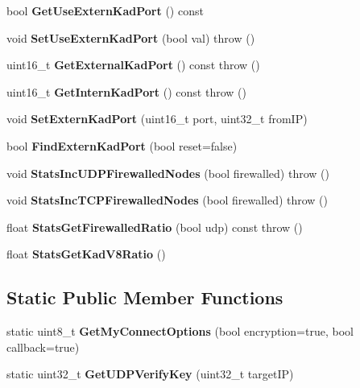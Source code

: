 \begin{DoxyCompactItemize}
\item 
bool {\bfseries GetUseExternKadPort} () const \label{classKademlia_1_1CPrefs_ae111c7c98b020a4cfd2593df2df389b2}

\item 
void {\bfseries SetUseExternKadPort} (bool val)  throw ()\label{classKademlia_1_1CPrefs_ac9e18ca59df611c6b7f33042c5206411}

\item 
uint16\_\-t {\bfseries GetExternalKadPort} () const   throw ()\label{classKademlia_1_1CPrefs_a98ee0bd69bb5c12e6f5aa9ae1091f518}

\item 
uint16\_\-t {\bfseries GetInternKadPort} () const   throw ()\label{classKademlia_1_1CPrefs_a96e68fb42c9a3696e2dae2fbdce6defe}

\item 
void {\bfseries SetExternKadPort} (uint16\_\-t port, uint32\_\-t fromIP)\label{classKademlia_1_1CPrefs_aa3e22c17c49c8e740e6c81715fdd3e69}

\item 
bool {\bfseries FindExternKadPort} (bool reset=false)\label{classKademlia_1_1CPrefs_af7755a2f8dd0b2d2e52a670c560e070e}

\item 
void {\bfseries StatsIncUDPFirewalledNodes} (bool firewalled)  throw ()\label{classKademlia_1_1CPrefs_a2af336eb55118123473dc3298c0ca432}

\item 
void {\bfseries StatsIncTCPFirewalledNodes} (bool firewalled)  throw ()\label{classKademlia_1_1CPrefs_a7c7420e659d7041317682e0be9a032ed}

\item 
float {\bfseries StatsGetFirewalledRatio} (bool udp) const   throw ()\label{classKademlia_1_1CPrefs_a4e9c97fb5d4bdc7a2d8556816e944094}

\item 
float {\bfseries StatsGetKadV8Ratio} ()\label{classKademlia_1_1CPrefs_a3d00c1ce4da3e938d6008e11d3be2f8d}

\end{DoxyCompactItemize}
\subsection*{Static Public Member Functions}
\begin{DoxyCompactItemize}
\item 
static uint8\_\-t {\bfseries GetMyConnectOptions} (bool encryption=true, bool callback=true)\label{classKademlia_1_1CPrefs_ad0a74e83a460dbfc4dc9e6ea60a33725}

\item 
static uint32\_\-t {\bfseries GetUDPVerifyKey} (uint32\_\-t targetIP)\label{classKademlia_1_1CPrefs_a77fdc095fc4f0bf071b561f01688c308}

\end{DoxyCompactItemize}

